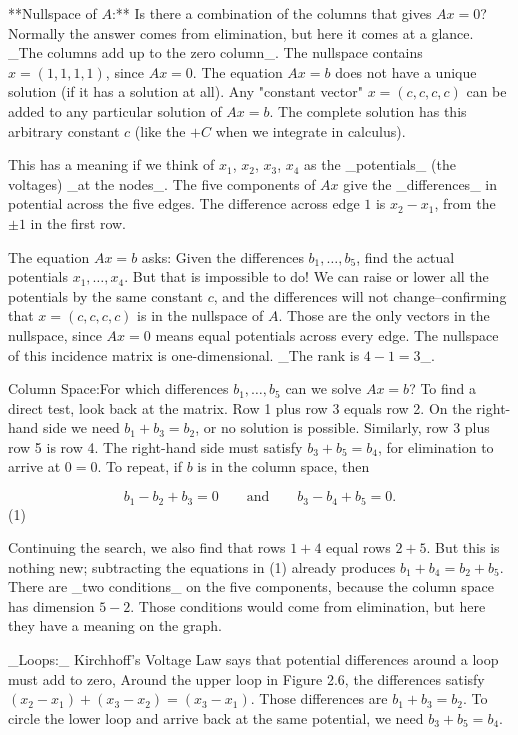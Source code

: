 

**Nullspace of \(A\):** Is there a combination of the columns that gives \(Ax=0\)? Normally the answer comes from elimination, but here it comes at a glance. _The columns add up to the zero column_. The nullspace contains \(x=(1,1,1,1)\), since \(Ax=0\). The equation \(Ax=b\) does not have a unique solution (if it has a solution at all). Any "constant vector" \(x=(c,c,c,c)\) can be added to any particular solution of \(Ax=b\). The complete solution has this arbitrary constant \(c\) (like the \(+C\) when we integrate in calculus).

This has a meaning if we think of \(x_{1}\), \(x_{2}\), \(x_{3}\), \(x_{4}\) as the _potentials_ (the voltages) _at the nodes_. The five components of \(Ax\) give the _differences_ in potential across the five edges. The difference across edge \(1\) is \(x_{2}-x_{1}\), from the \(\pm 1\) in the first row.

The equation \(Ax=b\) asks: Given the differences \(b_{1},\ldots,b_{5}\), find the actual potentials \(x_{1},\ldots,x_{4}\). But that is impossible to do! We can raise or lower all the potentials by the same constant \(c\), and the differences will not change--confirming that \(x=(c,c,c,c)\) is in the nullspace of \(A\). Those are the only vectors in the nullspace, since \(Ax=0\) means equal potentials across every edge. The nullspace of this incidence matrix is one-dimensional. _The rank is \(4-1=3\)_.

Column Space:For which differences \(b_{1},\ldots,b_{5}\) can we solve \(Ax=b\)? To find a direct test, look back at the matrix. Row 1 plus row 3 equals row 2. On the right-hand side we need \(b_{1}+b_{3}=b_{2}\), or no solution is possible. Similarly, row 3 plus row 5 is row 4. The right-hand side must satisfy \(b_{3}+b_{5}=b_{4}\), for elimination to arrive at \(0=0\). To repeat, if \(b\) is in the column space, then

\[b_{1}-b_{2}+b_{3}=0\qquad\text{and}\qquad b_{3}-b_{4}+b_{5}=0.\] (1)

Continuing the search, we also find that rows \(1+4\) equal rows \(2+5\). But this is nothing new; subtracting the equations in (1) already produces \(b_{1}+b_{4}=b_{2}+b_{5}\). There are _two conditions_ on the five components, because the column space has dimension \(5-2\). Those conditions would come from elimination, but here they have a meaning on the graph.

_Loops:_ Kirchhoff's Voltage Law says that potential differences around a loop must add to zero, Around the upper loop in Figure 2.6, the differences satisfy \((x_{2}-x_{1})+(x_{3}-x_{2})=(x_{3}-x_{1})\). Those differences are \(b_{1}+b_{3}=b_{2}\). To circle the lower loop and arrive back at the same potential, we need \(b_{3}+b_{5}=b_{4}\).

